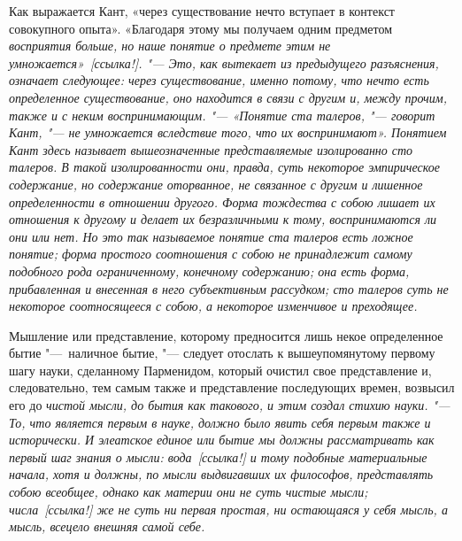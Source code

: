 Как выражается Кант, «через существование нечто вступает в контекст
совокупного опыта». «Благодаря этому мы получаем одним предметом
\em{восприятия} больше, но наше
\em{понятие} о предмете этим не
умножается»~[ссылка!]. "--- Это, как вытекает из предыдущего
разъяснения, означает следующее: через существование, именно потому, что
нечто есть определенное существование, оно находится в связи с
\em{другим} и, между прочим, также и с неким
воспринимающим. "--- «Понятие ста талеров, "--- говорит Кант, "--- не умножается
вследствие того, что их воспринимают». \em{Понятием}
Кант здесь называет вышеозначенные представляемые
\em{изолированно} сто талеров. В такой изолированности
они, правда, суть некоторое эмпирическое содержание, но содержание
оторванное, не связанное с \em{другим} и лишенное
определенности в отношении \em{другого}. Форма
тождества с собою лишает их отношения к другому и делает их безразличными к
тому, воспринимаются ли они или нет. Но это так называемое
\em{понятие} ста талеров есть ложное понятие; форма
простого соотношения с собою не принадлежит самому подобного рода
ограниченному, конечному содержанию; она есть форма, прибавленная и
внесенная в него субъективным рассудком; сто талеров суть не некоторое
соотносящееся с собою, а некоторое изменчивое и преходящее.

Мышление или представление, которому предносится лишь некое определенное
бытие "---~наличное бытие, "--- следует отослать к вышеупомянутому первому шагу
науки, сделанному Парменидом, который очистил свое представление и,
следовательно, тем самым также и представление последующих времен, возвысил
его до \em{чистой мысли}, до бытия как такового, и
этим создал стихию науки. "--- То, что является
\em{первым в науке}, должно было явить себя первым
также и \em{исторически}. И элеатское
\em{единое} или \em{бытие} мы
должны рассматривать как первый шаг знания о мысли:
\em{вода\textup{~}}[ссылка!] и тому
подобные материальные начала, хотя и \em{должны}, по
мысли выдвигавших их философов, представлять собою всеобщее, однако как
материи они не суть чистые мысли;
\em{числа}~[ссылка!] же не суть ни первая
простая, ни остающаяся у себя мысль, а мысль, всецело внешняя самой себе.

